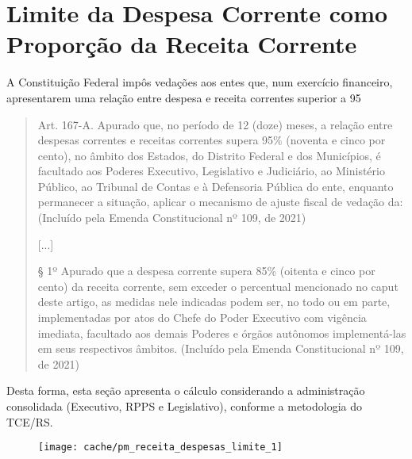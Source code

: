 
\section[Limite da Despesa Corrente vs Receita Corrente]{Limite da Despesa Corrente como Proporção da Receita Corrente}

A Constituição Federal impôs vedações aos entes que, num exercício financeiro, apresentarem uma relação entre despesa e receita correntes superior a 95%
 
\begin{quotation}
Art. 167-A. Apurado que, no período de 12 (doze) meses, a relação entre despesas correntes e receitas correntes supera 95\% (noventa e cinco por cento), no âmbito dos Estados, do Distrito Federal e dos Municípios, é facultado aos Poderes Executivo, Legislativo e Judiciário, ao Ministério Público, ao Tribunal de Contas e à Defensoria Pública do ente, enquanto permanecer a situação, aplicar o mecanismo de ajuste fiscal de vedação da: (Incluído pela Emenda Constitucional nº 109, de 2021)

[...]

§ 1º Apurado que a despesa corrente supera 85\% (oitenta e cinco por cento) da receita corrente, sem exceder o percentual mencionado no caput deste artigo, as medidas nele indicadas podem ser, no todo ou em parte, implementadas por atos do Chefe do Poder Executivo com vigência imediata, facultado aos demais Poderes e órgãos autônomos implementá-las em seus respectivos âmbitos. (Incluído pela Emenda Constitucional nº 109, de 2021)
\end{quotation}

Desta forma, esta seção apresenta o cálculo considerando a administração consolidada (Executivo, RPPS e Legislativo), conforme a metodologia do TCE/RS.




\begin{figure}[H]
\center
\texttt{[image: cache/pm\_receita\_despesas\_limite\_1]}
\end{figure}
